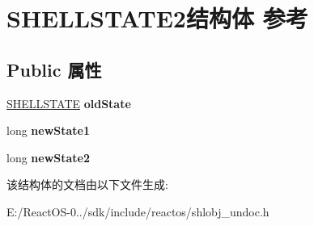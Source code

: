 \hypertarget{struct_s_h_e_l_l_s_t_a_t_e2}{}\section{S\+H\+E\+L\+L\+S\+T\+A\+T\+E2结构体 参考}
\label{struct_s_h_e_l_l_s_t_a_t_e2}
\subsection*{Public 属性}
\begin{DoxyCompactItemize}
\item 
\mbox{\label{struct_s_h_e_l_l_s_t_a_t_e2_a5cb6faee62e3f1701d8e2ff1679ad3a6}} 
\hyperlink{struct_s_h_e_l_l_s_t_a_t_e}{S\+H\+E\+L\+L\+S\+T\+A\+TE} {\bfseries old\+State}
\item 
\mbox{\label{struct_s_h_e_l_l_s_t_a_t_e2_a010f58758e189e2ce1627df22ae17821}} 
long {\bfseries new\+State1}
\item 
\mbox{\label{struct_s_h_e_l_l_s_t_a_t_e2_a853d108273c775d6406c15ace80515ce}} 
long {\bfseries new\+State2}
\end{DoxyCompactItemize}


该结构体的文档由以下文件生成\+:\begin{DoxyCompactItemize}
\item 
E\+:/\+React\+O\+S-\/0../sdk/include/reactos/shlobj\+\_\+undoc.\+h\end{DoxyCompactItemize}
